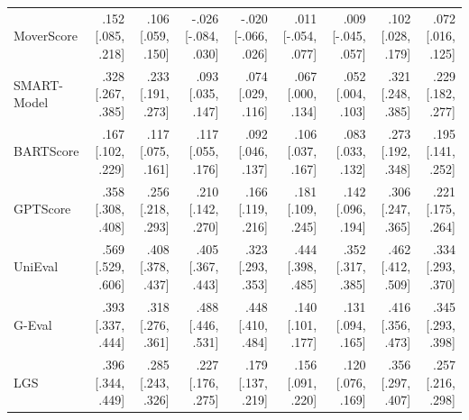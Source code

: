 \begin{table}[t]
\begin{tabular}{lrrrrrrrr}
MoverScore & .152 {\scriptsize [.085, .218]} & .106 {\scriptsize [.059, .150]} & -.026 {\scriptsize [-.084, .030]} & -.020 {\scriptsize [-.066, .026]} & .011 {\scriptsize [-.054, .077]} & .009 {\scriptsize [-.045, .057]} & .102 {\scriptsize [.028, .179]} & .072 {\scriptsize [.016, .125]} \\
SMART-Model & .328 {\scriptsize [.267, .385]} & .233 {\scriptsize [.191, .273]} & .093 {\scriptsize [.035, .147]} & .074 {\scriptsize [.029, .116]} & .067 {\scriptsize [.000, .134]} & .052 {\scriptsize [.004, .103]} & .321 {\scriptsize [.248, .385]} & .229 {\scriptsize [.182, .277]} \\
BARTScore & .167 {\scriptsize [.102, .229]} & .117 {\scriptsize [.075, .161]} & .117 {\scriptsize [.055, .176]} & .092 {\scriptsize [.046, .137]} & .106 {\scriptsize [.037, .167]} & .083 {\scriptsize [.033, .132]} & .273 {\scriptsize [.192, .348]} & .195 {\scriptsize [.141, .252]} \\
GPTScore & .358 {\scriptsize [.308, .408]} & .256 {\scriptsize [.218, .293]} & .210 {\scriptsize [.142, .270]} & .166 {\scriptsize [.119, .216]} & .181 {\scriptsize [.109, .245]} & .142 {\scriptsize [.096, .194]} & .306 {\scriptsize [.247, .365]} & .221 {\scriptsize [.175, .264]} \\
UniEval & .569 {\scriptsize [.529, .606]} & .408 {\scriptsize [.378, .437]} & .405 {\scriptsize [.367, .443]} & .323 {\scriptsize [.293, .353]} & .444 {\scriptsize [.398, .485]} & .352 {\scriptsize [.317, .385]} & .462 {\scriptsize [.412, .509]} & .334 {\scriptsize [.293, .370]} \\
G-Eval & .393 {\scriptsize [.337, .444]} & .318 {\scriptsize [.276, .361]} & .488 {\scriptsize [.446, .531]} & .448 {\scriptsize [.410, .484]} & .140 {\scriptsize [.101, .177]} & .131 {\scriptsize [.094, .165]} & .416 {\scriptsize [.356, .473]} & .345 {\scriptsize [.293, .398]} \\
LGS & .396 {\scriptsize [.344, .449]} & .285 {\scriptsize [.243, .326]} & .227 {\scriptsize [.176, .275]} & .179 {\scriptsize [.137, .219]} & .156 {\scriptsize [.091, .220]} & .120 {\scriptsize [.076, .169]} & .356 {\scriptsize [.297, .407]} & .257 {\scriptsize [.216, .298]} \\
\bottomrule
\end{tabular}
\end{table}
